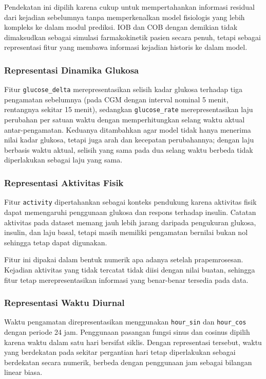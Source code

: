 Pendekatan ini dipilih karena cukup untuk mempertahankan informasi residual dari kejadian sebelumnya tanpa memperkenalkan model fisiologis yang lebih kompleks ke dalam
modul prediksi. IOB dan COB dengan demikian tidak dimaksudkan sebagai simulasi farmakokinetik pasien secara penuh, tetapi sebagai representasi fitur yang membawa
informasi kejadian historis ke dalam model.

\subsubsection{Representasi Dinamika Glukosa}
\label{subsubsec:bab5-dinamika-glukosa}

Fitur \texttt{glucose\_delta} merepresentasikan selisih kadar glukosa terhadap tiga pengamatan sebelumnya (pada CGM dengan interval nominal 5 menit, rentangnya
sekitar 15 menit), sedangkan \texttt{glucose\_rate} merepresentasikan laju perubahan per satuan waktu dengan memperhitungkan selang waktu aktual antar-pengamatan.
Keduanya ditambahkan agar model tidak hanya menerima nilai kadar glukosa, tetapi juga arah dan kecepatan perubahannya; dengan laju berbasis waktu aktual, selisih
yang sama pada dua selang waktu berbeda tidak diperlakukan sebagai laju yang sama.

\subsubsection{Representasi Aktivitas Fisik}
\label{subsubsec:bab5-aktivitas}

Fitur \texttt{activity} dipertahankan sebagai konteks pendukung karena aktivitas fisik dapat memengaruhi penggunaan glukosa dan respons terhadap insulin.
Catatan aktivitas pada dataset memang jauh lebih jarang daripada pengukuran glukosa, insulin, dan laju basal, tetapi masih memiliki pengamatan bernilai bukan nol
sehingga tetap dapat digunakan.

Fitur ini dipakai dalam bentuk numerik apa adanya setelah prapemrosesan. Kejadian aktivitas yang tidak tercatat tidak diisi dengan nilai buatan, sehingga fitur
tetap merepresentasikan informasi yang benar-benar tersedia pada data.

\subsubsection{Representasi Waktu Diurnal}
\label{subsubsec:bab5-diurnal}

Waktu pengamatan direpresentasikan menggunakan \texttt{hour\_sin} dan \texttt{hour\_cos} dengan periode 24 jam. Penggunaan pasangan fungsi sinus dan cosinus
dipilih karena waktu dalam satu hari bersifat siklis. Dengan representasi tersebut, waktu yang berdekatan pada sekitar pergantian hari tetap diperlakukan sebagai
berdekatan secara numerik, berbeda dengan penggunaan jam sebagai bilangan linear biasa.


